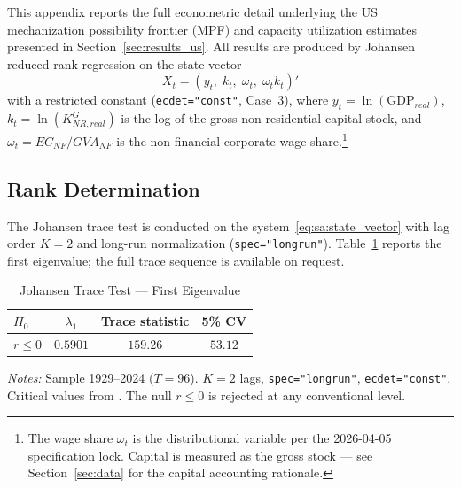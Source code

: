 
This appendix reports the full econometric detail underlying the US
mechanization possibility frontier (MPF) and capacity utilization estimates
presented in Section~\ref{sec:results_us}. All results are produced by
Johansen reduced-rank regression on the state vector
%
\begin{equation}
    X_t = \left(y_t,\; k_t,\; \omega_t,\; \omega_t k_t\right)'
    \label{eq:sa:state_vector}
\end{equation}
%
with a restricted constant (\texttt{ecdet="const"}, Case~3), where $y_t =
\ln(\text{GDP}_{real})$, $k_t = \ln(K^G_{NR,real})$ is the log of the gross
non-residential capital stock, and $\omega_t = EC_{NF}/GVA_{NF}$ is the
non-financial corporate wage share.\footnote{The wage share $\omega_t$ is the
distributional variable per the 2026-04-05 specification lock. Capital is
measured as the gross stock --- see Section~\ref{sec:data} for the capital
accounting rationale.}


\subsection{Rank Determination}
\label{app:sa:rank}

The Johansen trace test is conducted on the system~\eqref{eq:sa:state_vector}
with lag order $K=2$ and long-run normalization (\texttt{spec="longrun"}).
Table~\ref{tab:sa:trace} reports the first eigenvalue; the full trace
sequence is available on request.

\begin{table}[htbp]
\centering
\caption{Johansen Trace Test --- First Eigenvalue}
\label{tab:sa:trace}
\begin{threeparttable}
\begin{tabular}{lccc}
\toprule
$H_0$ & $\lambda_1$ & Trace statistic & 5\% CV \\
\midrule
$r \leq 0$ & $0.5901$ & $159.26$ & $53.12$ \\
\bottomrule
\end{tabular}
\begin{tablenotes}
\small
\item \textit{Notes:} Sample 1929--2024 ($T = 96$). $K = 2$ lags,
\texttt{spec="longrun"}, \texttt{ecdet="const"}.
Critical values from \citet{Osterwald-Lenum1992}.
The null $r \leq 0$ is rejected at any conventional level.
\end{tablenotes}
\end{threeparttable}
\end{table}

